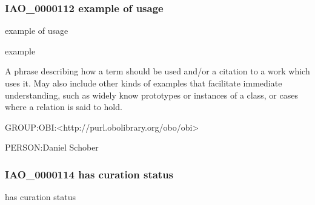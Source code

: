\documentclass[letterpaper,10pt,english]{sphinxmanual}
\begin{document}
\subsubsection{IAO\_0000112 \sphinxhyphen{} example of usage}
\label{\detokenize{doc-IAO_0000112:iao-0000112-example-of-usage}}\label{\detokenize{doc-IAO_0000112:index-0}}\label{\detokenize{doc-IAO_0000112::doc}}
\begin{sphinxShadowBox}

\sphinxAtStartPar
example of usage
\end{sphinxShadowBox}

\begin{sphinxShadowBox}

\sphinxAtStartPar
example
\end{sphinxShadowBox}

\begin{sphinxShadowBox}

\sphinxAtStartPar
A phrase describing how a term should be used and/or a citation to a work which uses it. May also include other kinds of examples that facilitate immediate understanding, such as widely know prototypes or instances of a class, or cases where a relation is said to hold.
\end{sphinxShadowBox}

\begin{sphinxShadowBox}

\sphinxAtStartPar
GROUP:OBI:\textless{}http://purl.obolibrary.org/obo/obi\textgreater{}
\end{sphinxShadowBox}

\begin{sphinxShadowBox}

\sphinxAtStartPar
PERSON:Daniel Schober
\end{sphinxShadowBox}
\begin{quote}

\ignorespaces \end{quote}


\subsubsection{IAO\_0000114 \sphinxhyphen{} has curation status}
\label{\detokenize{doc-IAO_0000114:iao-0000114-has-curation-status}}\label{\detokenize{doc-IAO_0000114:index-0}}\label{\detokenize{doc-IAO_0000114::doc}}
\begin{sphinxShadowBox}

\sphinxAtStartPar
has curation status
\end{sphinxShadowBox}
\end{document}
